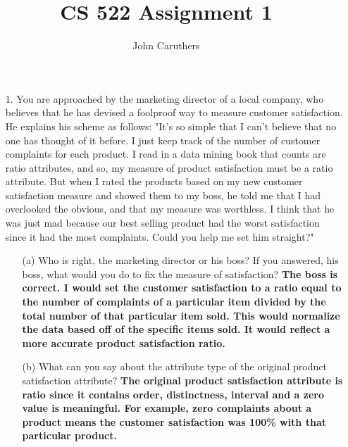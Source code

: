 \documentclass{article}
\title{CS 522 Assignment 1}
\author{John Caruthers}
\begin{document}
\maketitle

\begin{itemize}
    \item[1.] You are approached by the marketing director of a local company, who believes that he has devised a foolproof way to measure customer satisfaction.  He explains his scheme as follows: "It's so simple that I can't believe that no one has thought of it before.  I just keep track of the number of customer complaints for each product.  I read in a data mining book that counts are ratio attributes, and so, my measure of product satisfaction must be a ratio attribute.  But when I rated the products based on my new customer satisfaction measure and showed them to my boss, he told me that I had overlooked the obvious, and that my measure was worthless.  I think that he was just mad because our best selling product had the worst satisfaction since it had the most complaints.  Could you help me set him straight?"
    \begin{itemize}
        \item[(a)] Who is right, the marketing director or his boss?  If you answered, his boss, what would you do to fix the measure of satisfaction?
        \textbf{The boss is correct.  I would set the customer satisfaction to a ratio equal to the number of complaints of a particular item divided by the total number of that particular item sold. This would normalize the data based off of the specific items sold.  It would reflect a more accurate product satisfaction ratio. }
        \item[(b)] What can you say about the attribute type of the original product satisfaction attribute?
        \textbf{The original product satisfaction attribute is ratio since it contains order, distinctness, interval and a zero value is meaningful.  For example, zero complaints about a product means the customer satisfaction was 100\% with that particular product.}
    \end{itemize}


\end{itemize}
\end{document}
